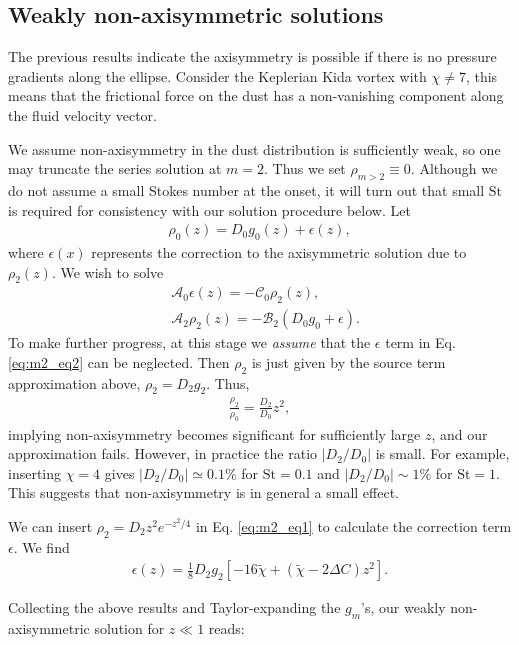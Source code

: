 \documentclass[12pt]{article} %
\begin{document}
\subsection{Weakly non-axisymmetric solutions}
The previous results indicate the axisymmetry is possible if there is no pressure gradients along the ellipse. Consider the Keplerian Kida vortex with $\chi\neq 7$, this means that the frictional force on the dust has a non-vanishing component along the fluid velocity vector. 

We assume non-axisymmetry in the dust distribution is sufficiently weak, so one may truncate the series solution at $m=2$. Thus we set $\rho_{m>2}\equiv0$. Although we do not assume a small Stokes number at the onset, it will turn out that small $\mathrm{St}$ is required for consistency with our solution procedure below. Let
\begin{align}
\rho_0(z) = D_0g_0(z) + \epsilon(z),
\end{align}
where $\epsilon(x)$ represents the correction to the axisymmetric
solution due to $\rho_2(z)$. We wish to solve
\begin{align}
&\mathcal{A}_0\epsilon(z) = -\mathcal{C}_0\rho_2(z),\label{eq:m2_eq1}\\
&\mathcal{A}_2\rho_2(z)   = -\mathcal{B}_2\left(D_0g_0 + \epsilon\right).\label{eq:m2_eq2}
\end{align}
To make further progress, at this stage we \emph{assume} that the
$\epsilon$ term in Eq. \ref{eq:m2_eq2} can be neglected. Then $\rho_2$ is just given 
by the source term approximation above, $\rho_2 = D_2 g_2$. Thus,
\begin{align}
\frac{\rho_2}{\rho_0} = \frac{D_2}{D_0}z^2,
\end{align}
implying non-axisymmetry becomes significant for sufficiently large $z$, and our approximation fails. However, in practice the ratio $|D_2/D_0|$ is small. 
For example, inserting $\chi=4$ gives $|D_2/D_0|\simeq0.1\%$ for $\mathrm{St}=0.1$ and $|D_2/D_0|\sim 1\%$ for $\mathrm{St}=1$. This suggests that non-axisymmetry is in general a small effect. 

We can insert $\rho_2 = D_2 z^2e^{-z^2/4}$ in Eq. \ref{eq:m2_eq1} to
calculate the correction term $\epsilon$. We find
\begin{align}
\epsilon(z) = \frac{1}{8}D_2g_2\left[-16\tilde{\chi}+\left(\tilde{\chi} - 2\Delta C\right)z^2\right].
\end{align}

Collecting the above results and Taylor-expanding the $g_m$'s, our
weakly non-axisymmetric solution for $z\ll 1$ reads:
\end{document}
